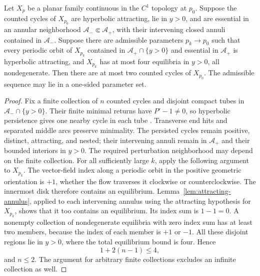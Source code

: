 \begin{lemma}\label{lem:generic-attracting-index}
Let $X_p$ be a planar family continuous in the $C^1$ topology at $p_0$.
Suppose the counted cycles of $X_{p_0}$ are hyperbolic attracting, lie
in $y>0$, and are essential in an annular neighborhood
$\mathcal A_-\Subset\mathcal A_+$, with their intervening closed annuli
contained in $\mathcal A_-$.  Suppose there are admissible parameters
$p_k\to p_0$ such that every periodic orbit of $X_{p_k}$ contained in
$\mathcal A_+\cap\{y>0\}$ and essential in $\mathcal A_+$ is hyperbolic
attracting, and $X_{p_k}$ has
at most four equilibria in $y>0$, all nondegenerate.
Then there are at most two counted cycles of $X_{p_0}$.
The admissible sequence may lie in a one-sided parameter set.
\end{lemma}
\begin{proof}
Fix a finite collection of $n$ counted cycles and disjoint compact tubes
in $\mathcal A_-\cap\{y>0\}$. Their finite minimal returns have
$P'-1\ne0$, so hyperbolic persistence gives one nearby cycle in each
tube \cite[Section~12.2, Lemmas~12.6--12.7]{Teschl2012}.
Transverse end hits and separated middle arcs preserve minimality.
The persisted cycles remain positive, distinct, attracting, and nested;
their intervening annuli remain in $\mathcal A_+$ and their bounded
interiors in $y>0$. The required perturbation neighborhood may depend
on the finite collection. For all sufficiently large $k$, apply the
following argument to $X_{p_k}$.
The vector-field index along a periodic orbit in the positive geometric
orientation is $+1$, whether the flow traverses it clockwise or
counterclockwise.  The innermost disk therefore contains an equilibrium.
Lemma~\ref{lem:attracting-annulus}, applied to each intervening annulus
using the attracting hypothesis for $X_{p_k}$, shows that it too contains
an equilibrium.  Its index sum is $1-1=0$.  A nonempty collection of
nondegenerate equilibria with zero index sum has at least two members,
because the index of each member is $+1$ or $-1$.  All these disjoint
regions lie in $y>0$, where the total equilibrium bound is four.  Hence
\[
 1+2(n-1)\le4,
\]
and $n\le2$.  The argument for arbitrary finite collections excludes an
infinite collection as well.
\end{proof}


